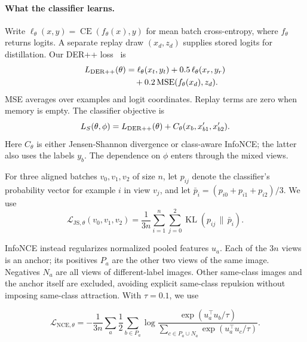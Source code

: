 \documentclass[10pt,twocolumn,letterpaper]{article}
\newcommand{\CE}{\operatorname{CE}}
\newcommand{\KL}{\operatorname{KL}}
\begin{document}
\paragraph{What the classifier learns.}
Write $\ell_\theta(x,y)=\CE(f_\theta(x),y)$ for mean batch cross-entropy, where $f_\theta$ returns logits. A separate replay draw $(x_d,z_d)$ supplies stored logits for distillation. Our DER++ loss~\cite{buzzega2020dark} is
\begin{align}
      L_{\rm DER++}(\theta)
       & =\ell_\theta(x_t,y_t)+0.5\,\ell_\theta(x_r,y_r)\notag \\
       & \quad+0.2\,\mathrm{MSE}(f_\theta(x_d),z_d).
\end{align}
MSE averages over examples and logit coordinates. Replay terms are zero when memory is empty. The classifier objective is
\begin{equation}
      L_S(\theta,\phi)=L_{\rm DER++}(\theta)
      + C_\theta(x_b,x'_{b1},x'_{b2}).
      \label{eq:support}
\end{equation}
Here $C_\theta$ is either Jensen-Shannon divergence or class-aware InfoNCE; the latter also uses the labels $y_b$. The dependence on $\phi$ enters through the mixed views.

For three aligned batches $v_0,v_1,v_2$ of size $n$, let $p_{ij}$ denote the classifier's probability vector for example $i$ in view $v_j$, and let $\bar p_i=(p_{i0}+p_{i1}+p_{i2})/3$. We use
\begin{equation}
      \mathcal{L}_{\mathrm{JS},\theta}(v_0,v_1,v_2)
      =\frac{1}{3n}\sum_{i=1}^n\sum_{j=0}^2\KL(p_{ij}\,\|\,\bar p_i).
      \label{eq:three-js}
\end{equation}

InfoNCE instead regularizes normalized pooled features $u_a$. Each of the $3n$ views is an anchor; its positives $P_a$ are the other two views of the same image. Negatives $N_a$ are all views of different-label images. Other same-class images and the anchor itself are excluded, avoiding explicit same-class repulsion without imposing same-class attraction. With $\tau=0.1$, we use

\begin{equation}
      \mathcal{L}_{\mathrm{NCE},\theta}=-\frac{1}{3n}\sum_a\frac{1}{2}\sum_{b\in P_a}
      \log\frac{\exp(u_a^\top u_b/\tau)}
      {\sum_{c\in P_a\cup N_a}\exp(u_a^\top u_c/\tau)}.
      \label{eq:seen-nce}
\end{equation}


\end{document}
